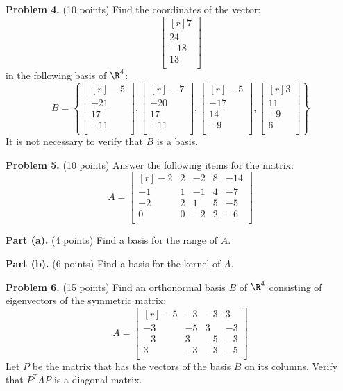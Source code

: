 \documentclass[12pt]{article}
\begin{document}
\textbf{Problem 4.} (10 points) Find the coordinates of the vector:
\[
\begin{bmatrix*}[r]7\\ 24\\ -18\\ 13\\ \end{bmatrix*}
\]
in the following basis of $\R^4$:
\[
B=\left\{
\begin{bmatrix*}[r]-5\\ -21\\ 17\\ -11\\ \end{bmatrix*},\begin{bmatrix*}[r]-7\\ -20\\ 17\\ -11\\ \end{bmatrix*},\begin{bmatrix*}[r]-5\\ -17\\ 14\\ -9\\ \end{bmatrix*},\begin{bmatrix*}[r]3\\ 11\\ -9\\ 6\\ \end{bmatrix*}
\right\}
\]
It is not necessary to verify that $B$ is a basis.

\clearpage

\textbf{Problem 5.} (10 points) Answer the following items for the matrix:
\[
A = \begin{bmatrix*}[r]-2&2&-2&8&-14\\-1&1&-1&4&-7\\-2&2&1&5&-5\\0&0&-2&2&-6\\\end{bmatrix*}
\]

\textbf{Part (a).} (4 points) Find a basis for the range of $A$.

\clearpage

\textbf{Part (b).} (6 points) Find a basis for the kernel of $A$.

\clearpage

\textbf{Problem 6.} (15 points) Find an orthonormal basis $B$ of $\R^4$ consisting of eigenvectors of the symmetric matrix:
\[
A = \begin{bmatrix*}[r]-5&-3&-3&3\\-3&-5&3&-3\\-3&3&-5&-3\\3&-3&-3&-5\\\end{bmatrix*}
\]
Let $P$ be the matrix that has the vectors of the basis $B$ on its columns. Verify that $P^TAP$ is a diagonal matrix.
\end{document}
